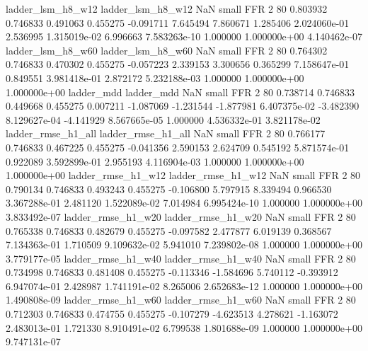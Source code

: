        ladder_lsm_h8_w12        ladder_lsm_h8_w12                   NaN      small      FFR                 2 80 0.803932       0.746833 0.491063       0.455275   -0.091711      7.645494      7.860671     1.285406   2.024060e-01  2.536995 1.315019e-02     6.996663   7.583263e-10            1.000000    1.000000e+00        4.140462e-07
       ladder_lsm_h8_w60        ladder_lsm_h8_w60                   NaN      small      FFR                 2 80 0.764302       0.746833 0.470302       0.455275   -0.057223      2.339153      3.300656     0.365299   7.158647e-01  0.849551 3.981418e-01     2.872172   5.232188e-03            1.000000    1.000000e+00        1.000000e+00
              ladder_mdd               ladder_mdd                   NaN      small      FFR                 2 80 0.738714       0.746833 0.449668       0.455275    0.007211     -1.087069     -1.231544    -1.877981   6.407375e-02 -3.482390 8.129627e-04    -4.141929   8.567665e-05            1.000000    4.536332e-01        3.821178e-02
      ladder_rmse_h1_all       ladder_rmse_h1_all                   NaN      small      FFR                 2 80 0.766177       0.746833 0.467225       0.455275   -0.041356      2.590153      2.624709     0.545192   5.871574e-01  0.922089 3.592899e-01     2.955193   4.116904e-03            1.000000    1.000000e+00        1.000000e+00
      ladder_rmse_h1_w12       ladder_rmse_h1_w12                   NaN      small      FFR                 2 80 0.790134       0.746833 0.493243       0.455275   -0.106800      5.797915      8.339494     0.966530   3.367288e-01  2.481120 1.522089e-02     7.014984   6.995424e-10            1.000000    1.000000e+00        3.833492e-07
      ladder_rmse_h1_w20       ladder_rmse_h1_w20                   NaN      small      FFR                 2 80 0.765338       0.746833 0.482679       0.455275   -0.097582      2.477877      6.019139     0.368567   7.134363e-01  1.710509 9.109632e-02     5.941010   7.239802e-08            1.000000    1.000000e+00        3.779177e-05
      ladder_rmse_h1_w40       ladder_rmse_h1_w40                   NaN      small      FFR                 2 80 0.734998       0.746833 0.481408       0.455275   -0.113346     -1.584696      5.740112    -0.393912   6.947074e-01  2.428987 1.741191e-02     8.265006   2.652683e-12            1.000000    1.000000e+00        1.490808e-09
      ladder_rmse_h1_w60       ladder_rmse_h1_w60                   NaN      small      FFR                 2 80 0.712303       0.746833 0.474755       0.455275   -0.107279     -4.623513      4.278621    -1.163072   2.483013e-01  1.721330 8.910491e-02     6.799538   1.801688e-09            1.000000    1.000000e+00        9.747131e-07
